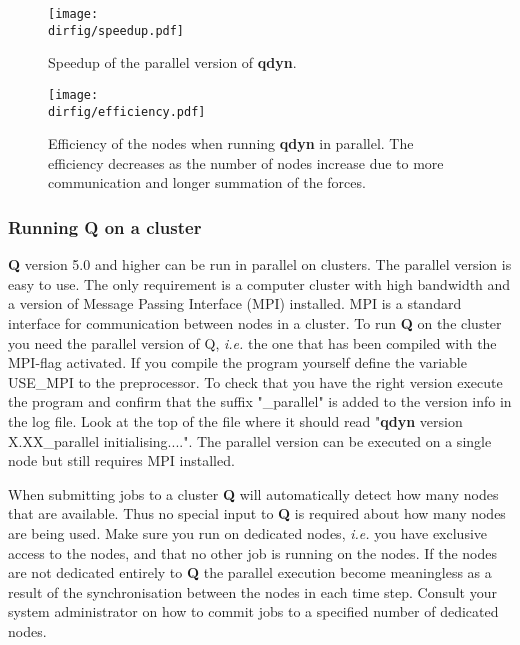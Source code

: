 \documentclass[a4paper,10pt]{article}
\newcommand{\dirfig}{./pictures}
\begin{document}
\begin{figure}[hbt]
\begin{center}
\texttt{[image: \\dirfig/speedup.pdf]}
\caption{Speedup of the parallel version of \textbf{qdyn}.}
\label{fig:speedup}
\end{center}
\end{figure}

\begin{figure}[hbt]
\begin{center}
\texttt{[image: \\dirfig/efficiency.pdf]}
\caption{Efficiency of the nodes when running \textbf{qdyn} in parallel.
The efficiency decreases as the number of nodes increase due to
more communication and longer summation of the forces.}
\label{fig:efficiency}
\end{center}
\end{figure}

\subsubsection{Running Q on a cluster} \textbf{Q} version 5.0 and higher can
be run in parallel on clusters. The parallel version is easy to
use. The only requirement is a computer cluster with high
bandwidth and a version of Message Passing Interface (MPI)
installed. MPI is a standard interface for communication between
nodes in a cluster. To run \textbf{Q} on the cluster you need the parallel
version of Q, \emph{i.e.} the one that has been compiled with the
MPI-flag activated. If you compile the program yourself define the
variable USE\_MPI to the preprocessor. To check that you have the
right version execute the program and confirm that the suffix
"\_parallel" is added to the version info in the log file. Look at
the top of the file where it should read "\textbf{qdyn} version
X.XX\_parallel initialising....". The parallel version can be
executed on a single node but still requires MPI installed.

When submitting jobs to a cluster \textbf{Q} will automatically detect how
many nodes that are available. Thus no special input to \textbf{Q} is
required about how many nodes are being used. Make sure you run on
dedicated nodes, \emph{i.e.} you have exclusive access to the
nodes, and that no other job is running on the nodes. If the nodes
are not dedicated entirely to \textbf{Q} the parallel execution become
meaningless as a result of the synchronisation between the nodes
in each time step. Consult your system administrator on how to
commit jobs to a specified number of dedicated nodes.
\end{document}
